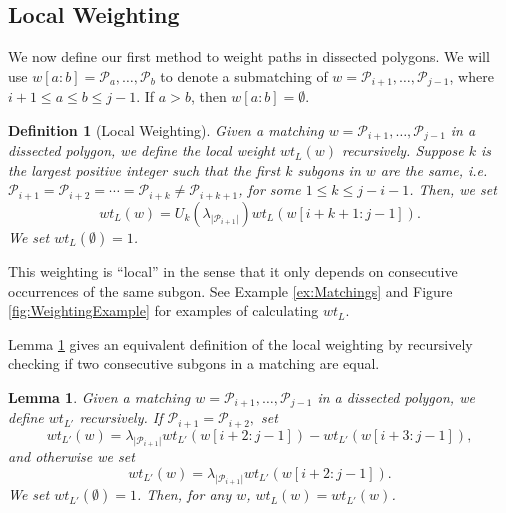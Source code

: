 \documentclass[12pt]{article}
\newtheorem{definition}{Definition}
\newtheorem{lemma}{Lemma}
\theoremstyle{remark}
\newcommand*{\poly}[1]{\mathcal{P}_{#1}}
\begin{document}
\subsection{Local Weighting}


We now define our first method to weight paths in dissected polygons. We will use $w[a:b] = \poly{a},\ldots,\poly{b}$ to denote a submatching of $w = \poly{i+1},\ldots,\poly{j-1}$, where $i+1\leq a\leq b\leq j-1$. If $a > b$, then $w[a:b] = \emptyset$.

\begin{definition}[Local Weighting]\label{def:LocalWeight}
Given a matching $w = \poly{i+1},\ldots,\poly{j-1}$ in a dissected polygon, we define the local weight $wt_L(w)$ recursively. Suppose $k$ is the largest positive integer such that the first $k$ subgons in $w$ are the same, i.e. $\poly{i+1} = \poly{i+2} = \cdots = \poly{i+k} \neq \poly{i+k+1}$, for some $1 \leq k \leq j-i-1$. Then, we set \[
wt_L(w) = U_k(\lambda_{\vert \poly{i+1}\vert}) wt_L(w[i+k+1:j-1]).
\]
We set $wt_L(\emptyset) = 1$.
\end{definition}

This weighting is ``local'' in the sense that it only depends on consecutive occurrences of the same subgon. See Example \ref{ex:Matchings} and Figure \ref{fig:WeightingExample} for examples of calculating $wt_L$. 


Lemma \ref{lem:EquivalentLocalWeight} gives an equivalent definition of the local weighting by recursively checking if two consecutive subgons in a matching are equal. 

\begin{lemma}\label{lem:EquivalentLocalWeight}
Given a matching  $w = \poly{i+1},\ldots,\poly{j-1}$ in a dissected polygon, we define $wt_{L'}$ recursively. If $\poly{i+1} = \poly{i+2},$ set \[
wt_{L'}(w) = \lambda_{\vert \poly{i+1}\vert} wt_{L'}(w[i+2:j-1]) - wt_{L'}(w[i+3:j-1]),
\]
and otherwise we set \[
wt_{L'}(w) = \lambda_{\vert \poly{i+1}\vert} wt_{L'}(w[i+2:j-1]).
\]
We set $wt_{L'}(\emptyset) = 1$.
Then, for any $w$, $wt_L(w) = wt_{L'}(w)$.
\end{lemma}
\end{document}
